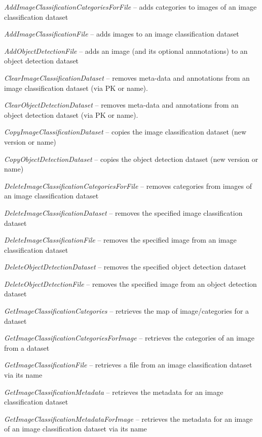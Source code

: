 \documentclass[a4paper]{book}
\begin{document}
\begin{tight_itemize}
  \item \textit{AddImageClassificationCategoriesForFile} -- adds categories to images of an image classification dataset
  \item \textit{AddImageClassificationFile} -- adds images to an image classification dataset
  \item \textit{AddObjectDetectionFile} -- adds an image (and its optional annnotations) to an object detection dataset
  \item \textit{ClearImageClassificationDataset} -- removes meta-data and annotations from an image classification dataset (via PK or name).
  \item \textit{ClearObjectDetectionDataset} -- removes meta-data and annotations from an object detection dataset (via PK or name).
  \item \textit{CopyImageClassificationDataset} -- copies the image classification dataset (new version or name)
  \item \textit{CopyObjectDetectionDataset} -- copies the object detection dataset (new version or name)
  \item \textit{DeleteImageClassificationCategoriesForFile} -- removes categories from images of an image classification dataset
  \item \textit{DeleteImageClassificationDataset} -- removes the specified image classification dataset
  \item \textit{DeleteImageClassificationFile} -- removes the specified image from an image classification dataset
  \item \textit{DeleteObjectDetectionDataset} -- removes the specified object detection dataset
  \item \textit{DeleteObjectDetectionFile} -- removes the specified image from an object detection dataset
  \item \textit{GetImageClassificationCategories} -- retrieves the map of image/categories for a dataset
  \item \textit{GetImageClassificationCategoriesForImage} -- retrieves the categories of an image from a dataset
  \item \textit{GetImageClassificationFile} -- retrieves a file from an image classification dataset via its name
  \item \textit{GetImageClassificationMetadata} -- retrieves the metadata for an image classification dataset
  \item \textit{GetImageClassificationMetadataForImage} -- retrieves the metadata for an image of an image classification dataset via its name

\end{tight_itemize}
\end{document}
